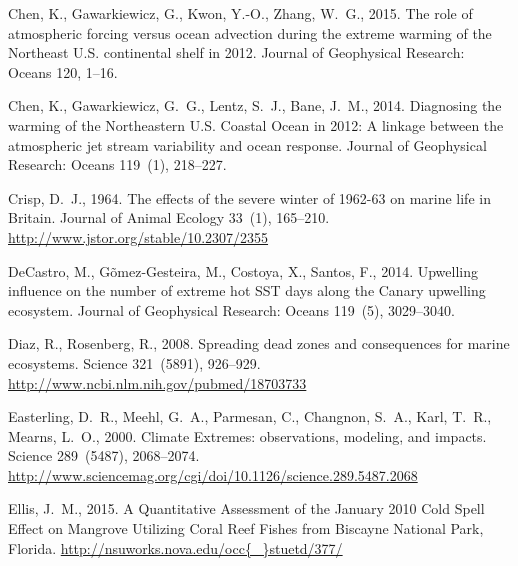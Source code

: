 \documentclass[a4paper,10pt,review]{elsarticle}
\begin{document}
\begin{thebibliography}{50}
Chen, K., Gawarkiewicz, G., Kwon, Y.-O., Zhang, W.~G., 2015. {The role of
  atmospheric forcing versus ocean advection during the extreme warming of the
  Northeast U.S. continental shelf in 2012}. Journal of Geophysical Research:
  Oceans 120, 1--16.

Chen, K., Gawarkiewicz, G.~G., Lentz, S.~J., Bane, J.~M., 2014. {Diagnosing the
  warming of the Northeastern U.S. Coastal Ocean in 2012: A linkage between the
  atmospheric jet stream variability and ocean response}. Journal of
  Geophysical Research: Oceans 119~(1), 218--227.

Crisp, D.~J., 1964. {The effects of the severe winter of 1962-63 on marine life
  in Britain}. Journal of Animal Ecology 33~(1), 165--210.
\newline\urlprefix\url{http://www.jstor.org/stable/10.2307/2355}

DeCastro, M., G{\~{o}}mez-Gesteira, M., Costoya, X., Santos, F., 2014.
  {Upwelling influence on the number of extreme hot SST days along the Canary
  upwelling ecosystem}. Journal of Geophysical Research: Oceans 119~(5),
  3029--3040.

Diaz, R., Rosenberg, R., 2008. {Spreading dead zones and consequences for
  marine ecosystems.} Science 321~(5891), 926--929.
\newline\urlprefix\url{http://www.ncbi.nlm.nih.gov/pubmed/18703733}

Easterling, D.~R., Meehl, G.~A., Parmesan, C., Changnon, S.~A., Karl, T.~R.,
  Mearns, L.~O., 2000. {Climate Extremes: observations, modeling, and impacts}.
  Science 289~(5487), 2068--2074.
\newline\urlprefix\url{http://www.sciencemag.org/cgi/doi/10.1126/science.289.5487.2068}

Ellis, J.~M., 2015. {A Quantitative Assessment of the January 2010 Cold Spell
  Effect on Mangrove Utilizing Coral Reef Fishes from Biscayne National Park,
  Florida}.
\newline\urlprefix\url{http://nsuworks.nova.edu/occ{\_}stuetd/377/}


\end{thebibliography}
\end{document}
